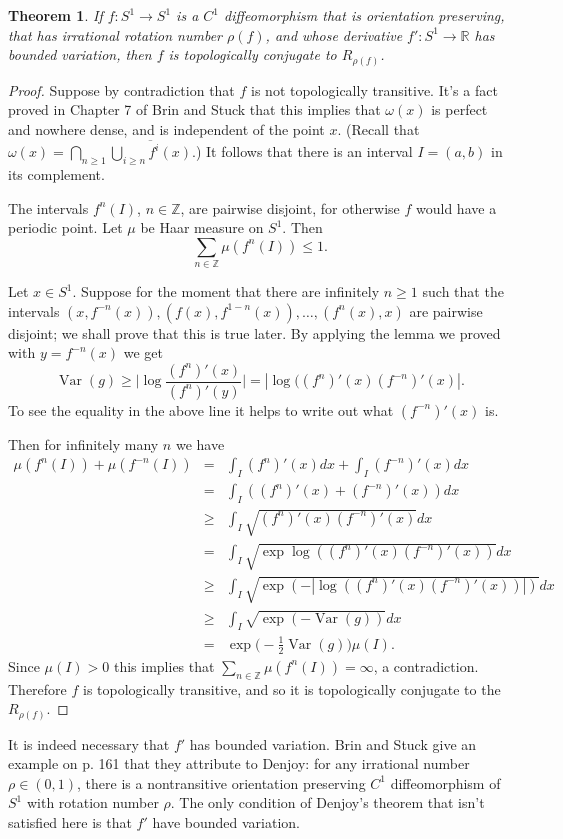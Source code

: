 \documentclass{article}
\newtheorem{theorem}{Theorem}
\newcommand{\Var}[0]{\operatorname{Var}}
\begin{document}
\begin{theorem}
If $f:S^1 \to S^1$ is a $C^1$ diffeomorphism that is orientation preserving, that has irrational rotation
number $\rho(f)$, and whose derivative $f':S^1 \to \mathbb{R}$ has bounded variation, then $f$ is topologically
conjugate to $R_{\rho(f)}$.
\end{theorem}
\begin{proof}
Suppose by contradiction that $f$ is not topologically transitive. It's a fact proved in Chapter 7
of Brin and Stuck that this implies that $\omega(x)$ is perfect and nowhere dense, and is independent
of the point $x$. (Recall that $\omega(x)=\bigcap_{n \geq 1} \overline{\bigcup_{i \geq n} f^i(x)}$.)
It follows that
 there is an interval $I=(a,b)$
in its complement.

The intervals $f^n(I)$, $n \in \mathbb{Z}$, are pairwise disjoint, for otherwise
$f$ would have a periodic point. Let $\mu$ be Haar measure on $S^1$. Then
\[
\sum_{n \in \mathbb{Z}} \mu(f^n(I)) \leq 1.
\]

Let $x \in S^1$. Suppose for the moment that there are infinitely $n \geq 1$ such that
the intervals $(x,f^{-n}(x)), (f(x),f^{1-n}(x)),\ldots, (f^n(x),x)$ are pairwise disjoint;
we shall prove that this is true later.
By applying the lemma we proved with
$y=f^{-n}(x)$ we get 
\[
\Var(g) \geq \Big| \log \frac{(f^n)'(x)}{(f^n)'(y)} \Big|=
|\log((f^n)'(x) (f^{-n})'(x)|. 
\]
To see the equality in the above line it helps to write out what $(f^{-n})'(x)$ is.

Then for infinitely many $n$ we have
\begin{eqnarray*}
\mu(f^n(I))+\mu(f^{-n}(I))&=&\int_I (f^n)'(x) dx +\int_I (f^{-n})'(x) dx\\
&=&\int_I ((f^n)'(x)+(f^{-n})'(x)) dx\\
&\geq&\int_I \sqrt{(f^n)'(x) (f^{-n})'(x)}dx\\
&=&\int_I \sqrt{\exp \log((f^n)'(x) (f^{-n})'(x))} dx\\
&\geq&\int_I \sqrt{\exp(-| \log((f^n)'(x) (f^{-n})'(x)) |)} dx\\
&\geq&\int_I \sqrt{\exp(-\Var(g))} dx\\
&=&\exp\Big( -\frac{1}{2}\Var(g) \Big) \mu(I).
\end{eqnarray*}
Since $\mu(I)>0$ this implies that $\sum_{n \in \mathbb{Z}} \mu(f^n(I))=\infty$, a contradiction. Therefore
$f$ is topologically transitive, and so it is topologically conjugate
to the $R_{\rho(f)}$.
\end{proof}

It is indeed necessary that $f'$ has bounded variation. Brin and Stuck give an example on p. 161 that they attribute to Denjoy: for any irrational number $\rho \in (0,1)$, there is a nontransitive orientation preserving $C^1$
diffeomorphism of $S^1$ with rotation number $\rho$. The only condition of Denjoy's theorem that isn't
satisfied here is that $f'$ have bounded variation.
\end{document}
